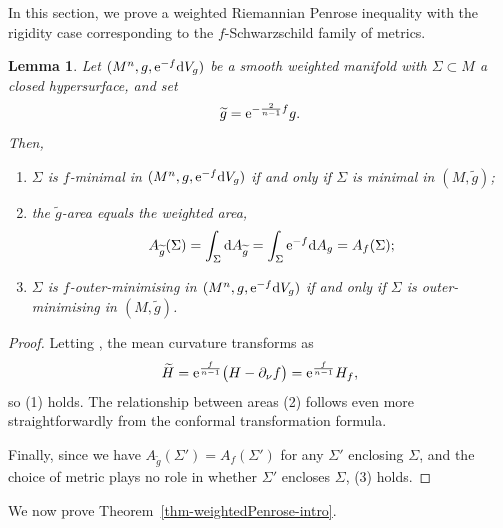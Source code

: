 \documentclass[10pt,a4paper]{amsart}
\numberwithin{equation}{section}
\newtheorem{Lemma}[Theorem]{Lemma}
\theoremstyle{definition}
\begin{document}
In this section, we prove a weighted Riemannian Penrose inequality with the rigidity case corresponding to the $f$-Schwarzschild family of metrics.

\begin{Lemma}\label{lem-fmin-to-min}
	Let $(M^n,g,{\rm e}^{-f}{\rm d}V_g)$ be a smooth weighted manifold with $\Sigma\subset M$ a closed hypersurface, and set
	\[
	\widetilde g = {\rm e}^{-\frac{2}{n-1}f} g.
	\]
	Then,
	\begin{enumerate}\itemsep=0pt
		\item[$(1)$] $\Sigma$ is $f$-minimal in $(M^n,g,{\rm e}^{-f}{\rm d}V_g)$ if and only if $\Sigma$ is minimal in $(M,\widetilde g)$;
		\item[$(2)$] the $\widetilde g$-area equals the weighted area,
		\[
		A_{\widetilde g}(\Sigma)=\int_\Sigma {\rm d}A_{\widetilde g}=\int_\Sigma {\rm e}^{-f} {\rm d}A_g = A_f(\Sigma);
		\]
		\item[$(3)$] $\Sigma$ is $f$-outer-minimising in $(M^n,g,{\rm e}^{-f}{\rm d}V_g)$ if and only if $\Sigma$ is outer-minimising in $(M,\widetilde g)$.
	\end{enumerate}
\end{Lemma}

\begin{proof}
	Letting , the mean curvature transforms as
	\[
	\widetilde H ={\rm e}^{\frac{f}{n-1}}\big(H-\partial_\nu f\big)={\rm e}^{\frac{f}{n-1}}H_f,
	\]
	so (1) holds. The relationship between areas (2) follows even more straightforwardly from the conformal transformation formula.
	
	Finally, since we have $A_{\widetilde g}(\Sigma')=A_f(\Sigma')$ for any $\Sigma'$ enclosing $\Sigma$, and the choice of metric plays no role in whether $\Sigma'$ encloses $\Sigma$, (3) holds.
\end{proof}

We now prove Theorem~\ref{thm-weightedPenrose-intro}.
\end{document}

